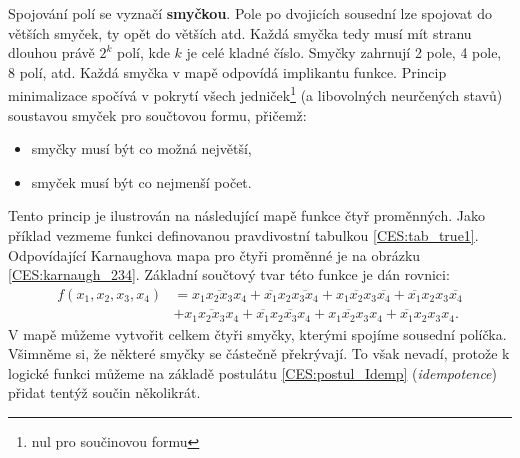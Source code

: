      Spojování polí se vyznačí \textbf{smyčkou}. Pole po dvojicích sousední lze spojovat do větších smyček, ty opět do větších
     atd. Každá smyčka tedy musí mít stranu dlouhou právě $2^k$ polí, kde $k$  je celé kladné číslo. Smyčky zahrnují 2 pole, 4
     pole, 8 polí, atd. Každá smyčka v mapě odpovídá implikantu funkce. Princip minimalizace spočívá v pokrytí všech
     jedniček\footnote{nul pro součinovou formu} (a libovolných neurčených stavů) soustavou smyček pro součtovou formu, přičemž:
     \begin{itemize}
       \item smyčky musí být co možná největší,
       \item smyček musí být co nejmenší počet.       
     \end{itemize}     
     Tento princip je ilustrován na následující mapě funkce čtyř proměnných. Jako příklad vezmeme funkci definovanou pravdivostní
     tabulkou \ref{CES:tab_true1}. Odpovídající Karnaughova mapa pro čtyři proměnné je na obrázku \ref{CES:karnaugh_234}. Základní
     součtový tvar této funkce je dán rovnici:     
     \begin{align}
        f(x_1, x_2, x_3, x_4) &= \overline{x_1x_2x_3x_4} + \overline{x_1}x_2\overline{x_3x_4} + x_1\overline{x_2}x_3\overline{x_4} + \overline{x_1}x_2x_3\overline{x_4} \nonumber \\ 
                              &+ x_1\overline{x_2x_3}x_4 + \overline{x_1}x_2\overline{x_3}x_4 + x_1\overline{x_2}x_3x_4 + \overline{x_1}x_2x_3x_4.                          
     \end{align}
     V mapě můžeme vytvořit celkem čtyři smyčky, kterými spojíme sousední políčka. Všimněme si, že některé smyčky se částečně
     překrývají. To však nevadí, protože k logické funkci můžeme na základě postulátu \ref{CES:postul_Idemp} (\emph{idempotence})
     přidat tentýž součin několikrát. 
     
